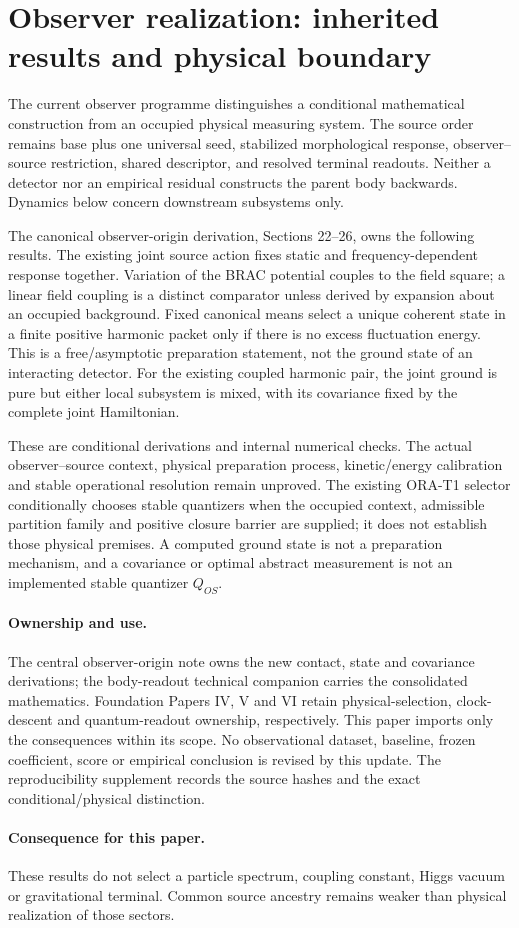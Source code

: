 \section{Observer realization: inherited results and physical boundary}
\label{sec:observer-update-20260914}
The current observer programme distinguishes a conditional mathematical
construction from an occupied physical measuring system. The source order
remains base plus one universal seed, stabilized morphological response,
observer--source restriction, shared descriptor, and resolved terminal
readouts. Neither a detector nor an empirical residual constructs the parent
body backwards. Dynamics below concern downstream subsystems only.

The canonical observer-origin derivation, Sections 22--26, owns the following
results. The existing joint source action fixes static and frequency-dependent
response together. Variation of the BRAC potential couples to the field
square; a linear field coupling is a distinct comparator unless derived by
expansion about an occupied background. Fixed canonical means select a unique
coherent state in a finite positive harmonic packet only if there is no excess
fluctuation energy. This is a free/asymptotic preparation statement, not the
ground state of an interacting detector. For the existing coupled harmonic
pair, the joint ground is pure but either local subsystem is mixed, with its
covariance fixed by the complete joint Hamiltonian.

These are conditional derivations and internal numerical checks. The actual
observer--source context, physical preparation process, kinetic/energy
calibration and stable operational resolution remain unproved. The existing
ORA-T1 selector conditionally chooses stable quantizers when the occupied
context, admissible partition family and positive closure barrier are supplied;
it does not establish those physical premises. A computed ground state is not
a preparation mechanism, and a covariance or optimal abstract measurement is
not an implemented stable quantizer $Q_{OS}$.

\paragraph{Ownership and use.}
The central observer-origin note owns the new contact, state and covariance
derivations; the body-readout technical companion carries the consolidated
mathematics. Foundation Papers IV, V and VI retain physical-selection,
clock-descent and quantum-readout ownership, respectively. This paper imports
only the consequences within its scope. No observational dataset, baseline,
frozen coefficient, score or empirical conclusion is revised by this update.
The reproducibility supplement records the source hashes and the exact
conditional/physical distinction.


\paragraph{Consequence for this paper.}
These results do not select a particle spectrum, coupling constant, Higgs vacuum or gravitational terminal. Common source ancestry remains weaker than physical realization of those sectors.
